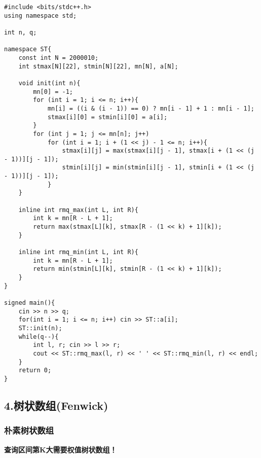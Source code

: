 \documentclass[]{article}
\begin{document}
\begin{verbatim}
#include <bits/stdc++.h>
using namespace std;

int n, q;

namespace ST{
    const int N = 2000010;
    int stmax[N][22], stmin[N][22], mn[N], a[N];

    void init(int n){
        mn[0] = -1;
        for (int i = 1; i <= n; i++){
            mn[i] = ((i & (i - 1)) == 0) ? mn[i - 1] + 1 : mn[i - 1];
            stmax[i][0] = stmin[i][0] = a[i];
        }
        for (int j = 1; j <= mn[n]; j++)
            for (int i = 1; i + (1 << j) - 1 <= n; i++){
                stmax[i][j] = max(stmax[i][j - 1], stmax[i + (1 << (j - 1))][j - 1]);
                stmin[i][j] = min(stmin[i][j - 1], stmin[i + (1 << (j - 1))][j - 1]);
            }
    }

    inline int rmq_max(int L, int R){
        int k = mn[R - L + 1];
        return max(stmax[L][k], stmax[R - (1 << k) + 1][k]);
    }

    inline int rmq_min(int L, int R){
        int k = mn[R - L + 1];
        return min(stmin[L][k], stmin[R - (1 << k) + 1][k]);
    }
}

signed main(){
    cin >> n >> q;
    for(int i = 1; i <= n; i++) cin >> ST::a[i];
    ST::init(n);
    while(q--){
        int l, r; cin >> l >> r;
        cout << ST::rmq_max(l, r) << ' ' << ST::rmq_min(l, r) << endl;
    }
    return 0;
}
\end{verbatim}

\hypertarget{ux6811ux72b6ux6570ux7ec4fenwick}{%
\subsection{4.树状数组(Fenwick)}\label{ux6811ux72b6ux6570ux7ec4fenwick}}

\hypertarget{ux6734ux7d20ux6811ux72b6ux6570ux7ec4}{%
\subsubsection{朴素树状数组}\label{ux6734ux7d20ux6811ux72b6ux6570ux7ec4}}

\textbf{查询区间第K大需要权值树状数组！}
\end{document}
